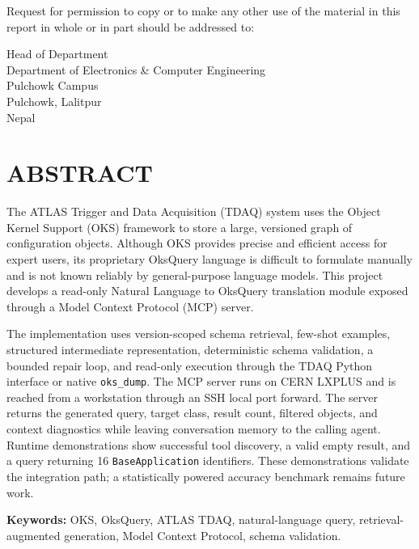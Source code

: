 \documentclass[12pt, a4paper]{report}
\begin{document}
\vspace{0.5cm}
\noindent Request for permission to copy or to make any other use of the material in this report in whole or in part should be addressed to:

\vspace{0.5cm}
\noindent Head of Department\\
Department of Electronics \& Computer Engineering \\
Pulchowk Campus \\
Pulchowk, Lalitpur\\
Nepal
\newpage

\chapter*{ABSTRACT}
The ATLAS Trigger and Data Acquisition (TDAQ) system uses the Object Kernel
Support (OKS) framework to store a large, versioned graph of configuration
objects. Although OKS provides precise and efficient access for expert users,
its proprietary OksQuery language is difficult to formulate manually and is
not known reliably by general-purpose language models. This project develops
a read-only Natural Language to OksQuery translation module exposed through a
Model Context Protocol (MCP) server.

The implementation uses version-scoped schema retrieval, few-shot examples,
structured intermediate representation, deterministic schema validation, a
bounded repair loop, and read-only execution through the TDAQ Python
interface or native \texttt{oks\_dump}. The MCP server runs on CERN LXPLUS and
is reached from a workstation through an SSH local port forward. The server
returns the generated query, target class, result count, filtered objects, and
context diagnostics while leaving conversation memory to the calling agent.
Runtime demonstrations show successful tool discovery, a valid empty result,
and a query returning 16 \texttt{BaseApplication} identifiers. These
demonstrations validate the integration path; a statistically powered accuracy
benchmark remains future work.

\textbf{Keywords:} OKS, OksQuery, ATLAS TDAQ, natural-language query,
retrieval-augmented generation, Model Context Protocol, schema validation.
\newpage

\end{document}
